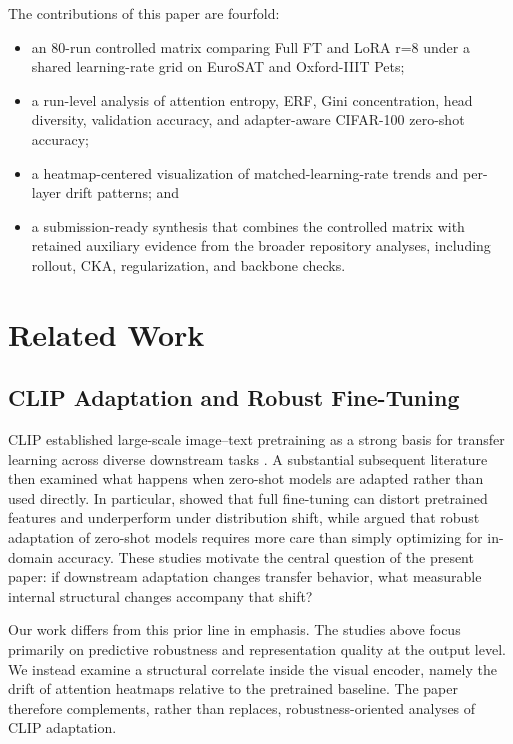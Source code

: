 \documentclass[10pt]{article}
\begin{document}
The contributions of this paper are fourfold:
\begin{itemize}
    \item an 80-run controlled matrix comparing Full FT and LoRA r=8 under a shared learning-rate grid on EuroSAT and Oxford-IIIT Pets;
    \item a run-level analysis of attention entropy, ERF, Gini concentration, head diversity, validation accuracy, and adapter-aware CIFAR-100 zero-shot accuracy;
    \item a heatmap-centered visualization of matched-learning-rate trends and per-layer drift patterns; and
    \item a submission-ready synthesis that combines the controlled matrix with retained auxiliary evidence from the broader repository analyses, including rollout, CKA, regularization, and backbone checks.
\end{itemize}

\section{Related Work}
\subsection{CLIP Adaptation and Robust Fine-Tuning}
CLIP established large-scale image--text pretraining as a strong basis for transfer learning across diverse downstream tasks \citep{radford2021learning}. A substantial subsequent literature then examined what happens when zero-shot models are adapted rather than used directly. In particular, \citet{kumar2022finetuning} showed that full fine-tuning can distort pretrained features and underperform under distribution shift, while \citet{wortsman2022robust} argued that robust adaptation of zero-shot models requires more care than simply optimizing for in-domain accuracy. These studies motivate the central question of the present paper: if downstream adaptation changes transfer behavior, what measurable internal structural changes accompany that shift?

Our work differs from this prior line in emphasis. The studies above focus primarily on predictive robustness and representation quality at the output level. We instead examine a structural correlate inside the visual encoder, namely the drift of attention heatmaps relative to the pretrained baseline. The paper therefore complements, rather than replaces, robustness-oriented analyses of CLIP adaptation.
\end{document}
